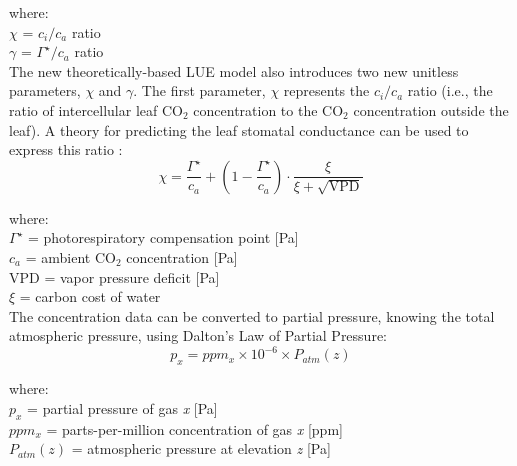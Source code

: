 \noindent where: \\
\indent $\chi$ = $c_{i}/c_{a}$ ratio\\
\indent $\gamma$ = $\Gamma^{\star}/c_{a}$ ratio \\

\noindent The new theoretically-based LUE model also introduces two new unitless parameters, $\chi$ and $\gamma$. 
The first parameter, $\chi$ represents the $c_{i}/c_{a}$ ratio (i.e., the ratio of intercellular leaf CO$_2$ concentration to the CO$_2$ concentration outside the leaf). 
A theory for predicting the leaf stomatal conductance can be used to express this ratio \parencite[Eq. 8]{prentice14}:
%
%
%
\begin{equation}
\label{eq:chi}
    \chi = \frac{\Gamma^{\star}}{c_{a}} + \left(1 - \frac{\Gamma^{\star}}{c_{a}} \right) \cdot \frac{\xi}{\xi + \sqrt{\text{VPD}}} 
\end{equation}

\noindent where:\\
\indent $\Gamma^{\star}$ = photorespiratory compensation point [Pa]\\
\indent $c_{a}$ = ambient CO$_2$ concentration [Pa]\\
\indent VPD = vapor pressure deficit [Pa]\\
\indent $\xi$ = carbon cost of water\\


%
%
The concentration data can be converted to partial pressure, knowing the total atmospheric pressure, using Dalton's Law of Partial Pressure:
\begin{equation}
\label{eq:pp}
    p_x = ppm_x \times 10^{-6} \times P_{atm}\left( z \right)
\end{equation}

\noindent where:\\
\indent $p_x$ = partial pressure of gas \textit{x} [Pa]\\
\indent $ppm_x$ = parts-per-million concentration of gas \textit{x} [ppm]\\
\indent $P_{atm}\left( z \right)$ = atmospheric pressure at elevation \textit{z} [Pa]\\



